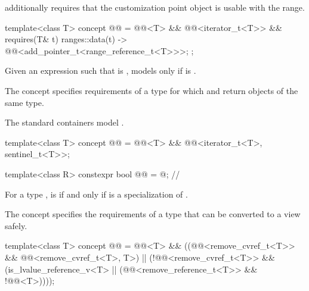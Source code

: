 \pnum
{} additionally requires that
the  customization point object
is usable with the range.

\begin{itemdecl}
template<class T>
  concept @@ =
    @@<T> && @@<iterator_t<T>> &&
    requires(T& t) {
      { ranges::data(t) } -> @@<add_pointer_t<range_reference_t<T>>>;
    };
\end{itemdecl}

\pnum
Given an expression  such that  is ,
 models  only if
is .

\pnum
The  concept specifies requirements of
a  type for which  and
 return objects of the same type.
\begin{example}
The standard containers model .
\end{example}

\begin{itemdecl}
template<class T>
  concept @@ =
    @@<T> && @@<iterator_t<T>, sentinel_t<T>>;
\end{itemdecl}

\begin{itemdecl}
template<class R>
  constexpr bool @@ = @\seebelow@;               // \expos
\end{itemdecl}

\begin{itemdescr}
\pnum
For a type ,
 is  if and only if
 is a specialization of .
\end{itemdescr}

\pnum
The  concept specifies the requirements of a
 type that can be converted to a view safely.

\begin{itemdecl}
template<class T>
  concept @@ =
    @@<T> &&
    ((@@<remove_cvref_t<T>> && @@<remove_cvref_t<T>, T>) ||
     (!@@<remove_cvref_t<T>> &&
      (is_lvalue_reference_v<T> || (@@<remove_reference_t<T>> && !@@<T>))));
\end{itemdecl}

